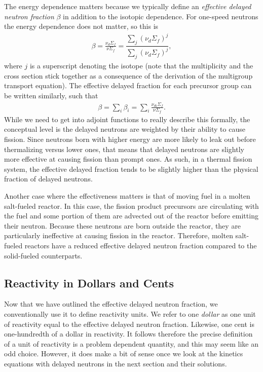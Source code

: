 The energy dependence matters because we typically define an \emph{effective delayed neutron fraction} $\beta$ in addition to the isotopic dependence. For one-speed neutrons the energy dependence does not matter, so this is
\begin{align}
  \beta = \frac{ \nu_d \Sigma_f }{ \nu \Sigma_f } = \dfrac{ \displaystyle\sum_j ( \nu_{d} \Sigma_f )^j }{ \displaystyle\sum_j ( \nu_{d} \Sigma_f )^j }, \label{Eq:kinetics_effectiveDelayedFraction_oneSpeed}
\end{align}
where $j$ is a superscript denoting the isotope (note that the multiplicity and the cross section stick together as a consequence of the derivation of the multigroup transport equation). The effective delayed fraction for each precursor group can be written similarly, such that
\begin{align}
  \beta = \sum_i \beta_{i} = \sum_i \frac{ \nu_{di} \Sigma_f }{ \nu \Sigma_f } .
\end{align}
While we need to get into adjoint functions to really describe this formally, the conceptual level is the delayed neutrons are weighted by their ability to cause fission. Since neutrons born with higher energy are more likely to leak out before thermalizing versus lower ones, that means that delayed neutrons are slightly more effective at causing fission than prompt ones. As such, in a thermal fission system, the effective delayed fraction tends to be slightly higher than the physical fraction of delayed neutrons.

Another case where the effectiveness matters is that of moving fuel in a molten salt-fueled reactor. In this case, the fission product precursors are circulating with the fuel and some portion of them are advected out of the reactor before emitting their neutron. Because these neutrons are born outside the reactor, they are particularly ineffective at causing fission in the reactor. Therefore, molten salt-fueled reactors have a reduced effective delayed neutron fraction compared to the solid-fueled counterparts.

\subsection{Reactivity in Dollars and Cents}

Now that we have outlined the effective delayed neutron fraction, we conventionally use it to define reactivity units. We refer to one \emph{dollar} as one unit of reactivity equal to the effective delayed neutron fraction. Likewise, one cent is one-hundredth of a dollar in reactivity. It follows therefore the precise definition of a unit of reactivity is a problem dependent quantity, and this may seem like an odd choice. However, it does make a bit of sense once we look at the kinetics equations with delayed neutrons in the next section and their solutions. 

